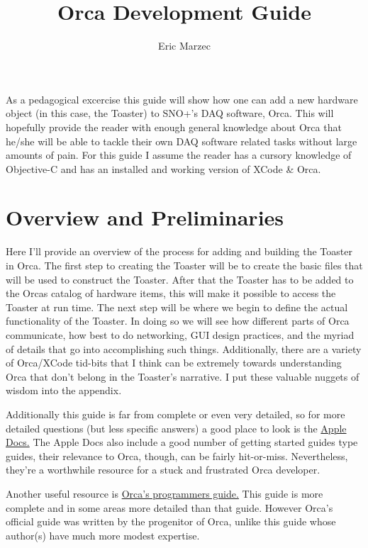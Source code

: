 \documentclass[12pt,a4paper]{article}
\author{Eric Marzec}
\title{Orca Development Guide}
\begin{document}
\maketitle
\tableofcontents

As a pedagogical excercise this guide will show how one can add a new hardware object (in this case, the
 Toaster) to SNO+'s DAQ software, Orca. This will hopefully provide the reader with enough general
  knowledge about Orca that he/she will be able to tackle their own DAQ software related tasks without large
   amounts of pain. For this guide I assume the reader has a cursory knowledge of Objective-C and has an
    installed and working version of XCode \& Orca. 
\\
\section{Overview and Preliminaries}
Here I'll provide an overview of the process for adding and building the Toaster in Orca.
The first step to creating the Toaster will be to create the basic files that will be used to construct the Toaster. 
After that the Toaster has to be added to the Orcas catalog of hardware items,
this will make it possible to access the Toaster at run time.
The next step will be where we begin to define the actual functionality of the Toaster.
In doing so we will see how different parts of Orca communicate, how best to do networking, GUI design practices, and the myriad of details that go into accomplishing such things.
Additionally, there are a variety of Orca/XCode tid-bits that I think can be extremely towards understanding Orca that don't belong in the Toaster's narrative.
 I put these valuable nuggets of wisdom into the appendix.


Additionally this guide is far from complete or even very detailed, so for more detailed questions (but less specific answers) a good place to look is the \href{https://developer.apple.com/library/mac/navigation/}{ Apple Docs.} The Apple Docs also include a good number of getting started guides type guides, their relevance to Orca, though, can be fairly hit-or-miss.
 Nevertheless, they're a worthwhile resource for a stuck and frustrated Orca developer.
 
 Another useful resource is \href{http://orca.physics.unc.edu/Programming/Index.html}{Orca's programmers guide.}
 This guide is more complete and in some areas more detailed than that guide.
   However Orca's official guide was written by the progenitor of Orca, unlike this guide whose author(s) have much more modest expertise. 
   
\end{document}
